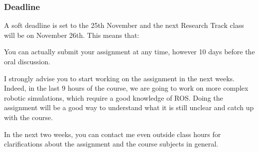 \subsubsection*{Deadline}

A soft deadline is set to the 25th November and the next Research Track class will be on November 26th. This means that\+:
\begin{DoxyItemize}
\item You can actually submit your assignment at any time, however 10 days before the oral discussion.
\item I strongly advise you to start working on the assignment in the next weeks. Indeed, in the last 9 hours of the course, we are going to work on more complex robotic simulations, which require a good knowledge of R\+OS. Doing the assignment will be a good way to understand what it is still unclear and catch up with the course.
\item In the next two weeks, you can contact me even outside class hours for clarifications about the assignment and the course subjects in general. 
\end{DoxyItemize}